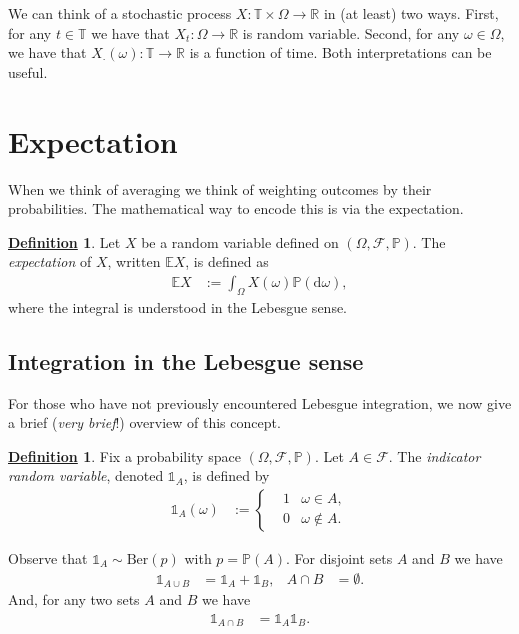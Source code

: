 \documentclass[12pt]{book}
\numberwithin{equation}{chapter}
\theoremstyle{plain}
\numberwithin{theorem}{section}
\theoremstyle{definition}
\newtheorem{definition}[theorem]{\underline{Definition}}
\numberwithin{exercise}{chapter}
\newcommand{\<}{\langle}
\renewcommand{\>}{\rangle}
\renewcommand{\(}{\left(}
\renewcommand{\)}{\right)}
\renewcommand{\[}{\left[}
\renewcommand{\]}{\right]}
\newcommand\Eb{\mathds{E}}
\newcommand\Ib{\mathds{1}} 	%
\newcommand\Pb{\mathds{P}}
\newcommand\Rb{\mathds{R}}
\newcommand\Fc{\mathscr{F}}
\newcommand\om{\omega}
\newcommand\Om{\Omega}
\newcommand\dd{\mathrm{d}}
\begin{document}
\noindent
We can think of a stochastic process $X : \mathds{T} \times \Om \to \Rb$ in (at least) two ways.  First, for any $t \in \mathds{T}$ we have that $X_t: \Om \to \Rb$ is random variable.  Second, for any $\om \in \Om$, we have that $X_\cdot(\om) : \mathds{T} \to \Rb$ is a function of time.  Both interpretations can be useful.


\section{Expectation}

When we think of averaging we think of weighting outcomes by their probabilities.  The mathematical way to encode this is via the expectation.

\begin{definition}
\label{def:E}
Let $X$ be a random variable defined on $(\Om,\Fc,\Pb)$.  The \emph{expectation} of $X$, written $\Eb X$, is defined as
\begin{align}
\Eb X
	&:=	\int_\Om X(\om) \Pb(\dd \om) ,
\end{align}
where the integral is understood in the Lebesgue sense.
\end{definition}

\subsection{Integration in the Lebesgue sense}
For those who have not previously encountered Lebesgue integration, we now give a brief (\emph{very brief}!) overview of this concept.

\begin{definition}
Fix a probability space $(\Om, \Fc, \Pb)$.  Let $A \in \Fc$.
The \emph{indicator random variable},
denoted $\Ib_A$, is defined by
\begin{align}
\Ib_A(\om)
	&:=	\left\{ \begin{aligned}
			&	1	& \om \in A , \\
			& 0 &	\om \notin A .
			\end{aligned} \right.
\end{align} 
\end{definition}

\noindent
Observe that $\Ib_A \sim \text{Ber}(p)$ with $p = \Pb(A)$.
For disjoint sets $A$ and $B$ we have
\begin{align}
\Ib_{A \cup B}
	&=	\Ib_A + \Ib_B , &
A \cap B
	&= \emptyset .
\end{align}
And, for any two sets $A$ and $B$ we have
\begin{align}
\Ib_{A \cap B}
	&=	\Ib_A \Ib_B .
\end{align}
\end{document}
